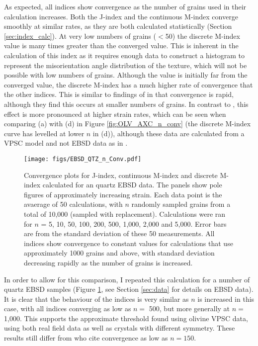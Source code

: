 \documentclass[a4paper,12pt,twoside]{report}
\numberwithin{equation}{chapter}
\begin{document}
As expected, all indices show convergence as the number of grains used in their calculation increases. Both the J-index and the continuous M-index converge smoothly at similar rates, as they are both calculated statistically (Section \ref{sec:index_calc}). At very low numbers of grains ($<$50) the discrete M-index value is many times greater than the converged value. This is inherent in the calculation of this index as it requires enough data to construct a histogram to represent the misorientation angle distribution of the texture, which will not be possible with low numbers of grains. Although the value is initially far from the converged value, the discrete M-index has a much higher rate of convergence that the other indices. This is similar to findings of \cite{Skemer} in that convergence is rapid, although they find this occurs at smaller numbers of grains. In contrast to \cite{Skemer}, this effect is more pronounced at higher strain rates, which can be seen when comparing (a) with (d) in Figure \ref{fig:OLV_AXC_n_conv} (the discrete M-index curve has levelled at lower $n$ in (d)), although these data are calculated from a VPSC model and not EBSD data as in \cite{Skemer}.

\begin{figure}[t!]
  \centering
    \texttt{[image: figs/EBSD\_QTZ\_n\_Conv.pdf]}
  \caption[Convergence with no. of grains (quartz EBSD)]{Convergence plots for J-index, continuous M-index and discrete M-index calculated for an quartz EBSD data. The panels show pole figures of approximately increasing strain. Each data point is the avaerage of 50 calculations, with $n$ randomly sampled grains from a total of 10,000 (sampled with replacement). Calculations were ran for $n$ = 5, 10, 50, 100, 200, 500, 1,000, 2,000 and 5,000. Error bars are from the standard deviation of these 50 measurements. All indices show convergence to constant values for calculations that use approximately 1000 grains and above, with standard deviation decreasing rapidly as the number of grains is increased.}
  \label{fig:EBSD_QTZ_n_conv}
\end{figure}

In order to allow for this comparison, I repeated this calculation for a number of quartz EBSD samples (Figure \ref{fig:EBSD_QTZ_n_conv}, see Section \ref{sec:data} for details on EBSD data). It is clear that the behaviour of the indices is very similar as $n$ is increased in this case, with all indices converging as low as $n =$ 500, but more generally at $n =$ 1,000. This supports the approximate threshold found using olivine VPSC data, using both real field data as well as crystals with  different symmetry. These results still differ from \cite{Skemer} who cite convergence as low as $n = 150$. 
\end{document}

